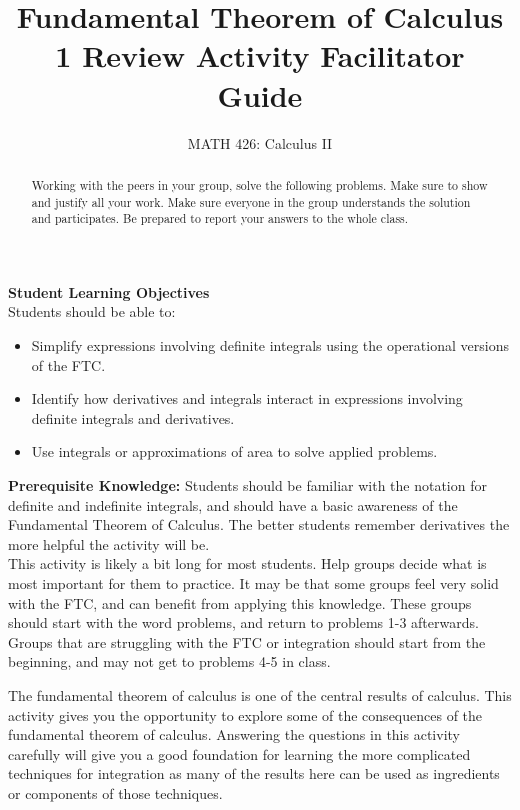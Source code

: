 \documentclass{ximera}
\title{Fundamental Theorem of Calculus 1 Review Activity Facilitator Guide}
\author{MATH 426: Calculus II}
\begin{document}
\begin{abstract}
   Working with the peers in your group, solve the following problems. Make sure to show and justify all your work. Make sure everyone in the group understands the solution and participates. Be prepared to report your answers to the whole class. 
\end{abstract}
\maketitle

\textbf{Student Learning Objectives}\\
Students should be able to:
\begin{itemize}
    \item Simplify expressions involving definite integrals using the operational versions of the FTC.
    \item Identify how derivatives and integrals interact in expressions involving definite integrals and derivatives.
    \item Use integrals or approximations of area to  solve applied problems.
\end{itemize}

\textbf{Prerequisite Knowledge:} Students should be familiar with the notation for definite and indefinite integrals, and should have a basic awareness of the Fundamental Theorem of Calculus. The better students remember derivatives the more helpful the activity will be.\\

This activity is likely a bit long for most students.  Help groups decide what is most important for them to practice.  It may be that some groups feel very solid with the FTC, and can benefit from applying this knowledge.  These groups should start with the word problems, and return to problems 1-3 afterwards.  Groups that are struggling with the FTC or integration should start from the beginning, and may not get to problems 4-5 in class.  

The fundamental theorem of calculus is one of the central results of calculus. This activity gives you the opportunity to explore some of the consequences of the fundamental theorem of calculus. Answering the questions in this activity carefully will give you a good foundation for learning the more complicated techniques for integration as many of the results here can be used as ingredients or components of those techniques.\\
\end{document}
